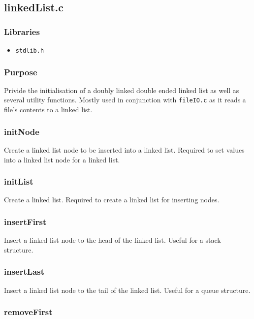 \documentclass[a4paper, 12pt, titlepage]{article}
\newcommand{\code}[1]{\small\texttt{#1}\normalsize}
\begin{document}
\pagebreak
\subsection{linkedList.c}
\subsubsection{Libraries}

\begin{itemize}[label={--}, noitemsep]
    \item \code{stdlib.h}
\end{itemize}

\subsubsection{Purpose}

Privide the initialisation of a doubly linked double ended linked list as
well as several utility functions. Mostly used in conjunction with
\code{fileIO.c} as it reads a file's contents to a linked list.

\subsubsection{initNode}

Create a linked list node to be inserted into a linked list. Required to
set values into a linked list node for a linked list.

\subsubsection{initList}

Create a linked list. Required to create a linked list for inserting nodes.

\subsubsection{insertFirst}

Insert a linked list node to the head of the linked list. Useful for a
stack structure.

\subsubsection{insertLast}

Insert a linked list node to the tail of the linked list. Useful for a
queue structure.

\subsubsection{removeFirst}
\end{document}

